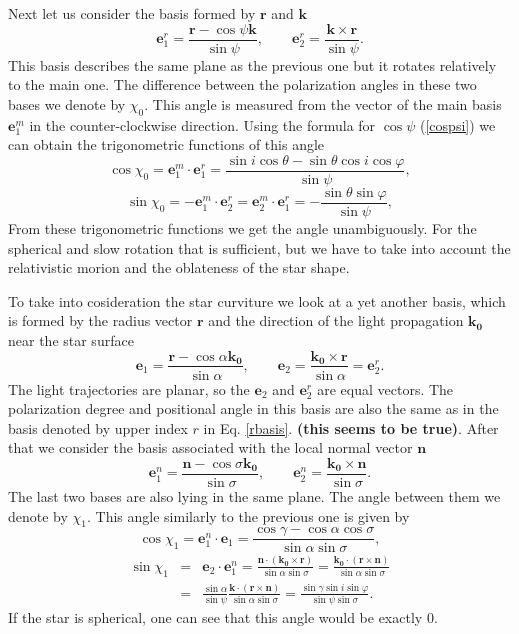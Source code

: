 \documentclass{aa}
\newcommand{\be}{\begin{equation}}
\newcommand{\ee}{\end{equation}}
\def\beq{\begin{eqnarray}}
\def\eeq{\end{eqnarray}}
\begin{document}
Next let us consider the basis formed by $\bm r$ and $\bm k$
\be\label{rbasis}
\bm{e}^r_1 = \frac{\bm{r}-\cos{\psi} \bm{k}}{\sin{\psi}},\qquad 
\bm{e}^r_2 = \frac{\bm{k} \times \bm{r}}{\sin{\psi}}.
\ee
This basis describes the same plane as the previous one but it rotates relatively to the main one.
The difference between the polarization angles in these two bases we denote by $ \chi_0 $.
This angle is measured from the vector of the main basis $\bm{e}_1^m$ in the counter-clockwise direction.
Using the formula for $\cos\psi$ (\ref{cospsi}) we can obtain the trigonometric functions of this angle 
\be
\cos{\chi_0}=\bm{e}_1^m \cdot \bm{e}^r_1 = \frac{\sin{i}\cos{\theta}-\sin{\theta}\cos{i}\cos{\varphi}}{\sin{\psi}} , 
\ee \be 
\sin{\chi_0}= - \bm{e}_1^m \cdot \bm{e}^r_2 = \bm{e}_2^m \cdot \bm{e}^r_1 = - \frac{\sin{\theta}\sin{\varphi}}{\sin{\psi}} ,
\ee
From these trigonometric functions we get the angle unambiguously. 
For the spherical and slow rotation that is sufficient, but we have to take into account the relativistic morion and the oblateness of the star shape.

To take into cosideration the star curviture we look at a yet another basis, which is formed by the radius vector $\bm{r}$ and the direction of the light propagation $\bm{k_0}$ near the star surface
\be\label{basis}
\bm{e}_1 = \frac{\bm{r}-\cos{\alpha} \bm{k_0}}{\sin{\alpha}},\qquad 
\bm{e}_2 = \frac{\bm{k_0} \times \bm{r}}{\sin{\alpha}}=\bm{e}^r_2.
\ee
The light trajectories are planar, so the $\bm{e}_2$ and $\bm{e}^r_2$ are equal vectors. The polarization degree and positional angle in this basis are also the same as in the basis denoted by upper index $r$ in Eq. \eqref{rbasis}. \textbf{(this seems to be true)}.
After that we consider the basis associated with the local normal vector  $\bm n $
\be\label{nbasis}
\bm{e}_1^n = \frac{\bm{n}-\cos{\sigma} \bm{k_0}}{\sin{\sigma}},\qquad 
\bm{e}_2^n = \frac{\bm{k_0} \times \bm{n}}{\sin{\sigma}} .
\ee
The last two bases are also lying in the same plane. The angle between them we denote by $\chi_1$.
This angle similarly to the previous one is given by  \be
\cos{\chi_1}=\bm{e}_1^n \cdot \bm{e}_1 = \frac{\cos\gamma-\cos\alpha\cos\sigma}{\sin{\alpha}\sin\sigma} , 
\ee
\beq
\sin{\chi_1} &=& \bm{e}_2 \cdot \bm{e}^n_1 = \frac{\bm{n} \cdot (\bm{k_0}\times\bm{r} )}{\sin\alpha\sin\sigma}
= \frac{\bm{k_0} \cdot (\bm{r}\times\bm{n} )}{\sin\alpha\sin\sigma} \nonumber \\
&=& \frac{\sin\alpha}{\sin\psi} \frac{ \bm{k} \cdot (\bm{r}\times\bm{n} )}{\sin\alpha\sin\sigma}
= \frac{ \sin\gamma\sin i \sin\varphi}{\sin\psi\sin\sigma}.
\eeq
If the star is spherical, one can see that this angle would be exactly $0$.
\end{document}
